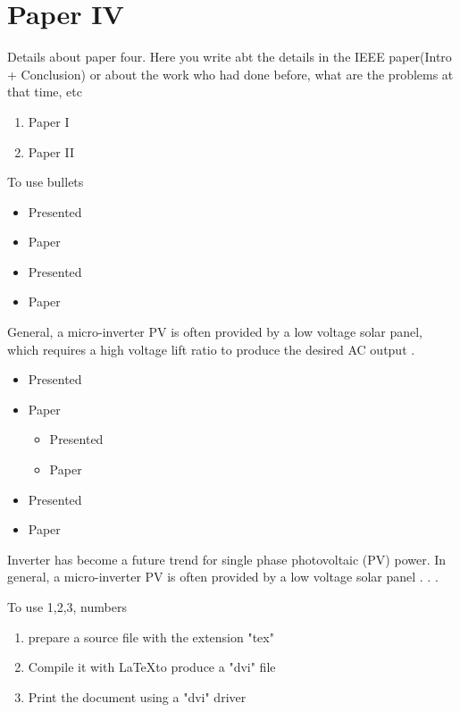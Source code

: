 \documentclass[12 pt, oneside]{book}
\begin{document}
\section{Paper IV}
Details about paper four. Here you write abt the details in the IEEE paper(Intro + Conclusion) or about the work who had done before, what are the problems at that time, etc

\begin{enumerate}
    \item Paper I
    \item Paper II
\end{enumerate}

To use bullets

\begin{itemize}
\item{Presented}
\item{Paper}
\item{Presented}
\item{Paper}
\end{itemize}

General, a micro-inverter PV  is often provided by a low voltage solar panel, which requires a high voltage lift ratio to produce the desired AC output .


\begin{itemize}
\item{Presented}
\item{Paper  }
	\begin{itemize}
		\item{Presented}
		\item{Paper  }
	\end{itemize}
\item{Presented}
\item{Paper  }
\end{itemize}


Inverter has become a future trend for single phase photovoltaic (PV) power. In general, a micro-inverter PV  is often provided by a low voltage solar panel . . . \vspace{2 cm} %




To use 1,2,3, numbers

\begin{enumerate}
\item prepare a source file with the extension "tex"
\item Compile it with \LaTeX to produce a "dvi" file
\item Print the document using a "dvi" driver
\end{enumerate}
\end{document}

